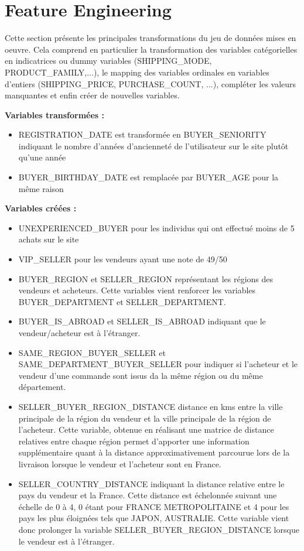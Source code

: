 
\chapter{Feature Engineering}

Cette section présente les principales transformations du jeu de données mises en oeuvre.
Cela comprend en particulier la transformation des variables catégorielles en
indicatrices ou dummy variables (SHIPPING_MODE, PRODUCT_FAMILY,...), le mapping des variables 
ordinales en variables d'entiers (SHIPPING_PRICE, PURCHASE_COUNT, ...),
compléter les valeurs manquantes et enfin créer de nouvelles variables.

\textbf{Variables transformées :}

\begin{itemize}
\item REGISTRATION_DATE est transformée en BUYER_SENIORITY indiquant le nombre d'années
d'ancienneté de l'utilisateur sur le site plutôt qu'une année 
\item BUYER_BIRTHDAY_DATE est remplacée par BUYER_AGE pour la même raison
\end{itemize}

\textbf{Variables créées :}

\begin{itemize}
\item UNEXPERIENCED_BUYER pour les individus qui ont effectué moins de 5 achats sur le site
\item VIP_SELLER pour les vendeurs ayant une note de 49/50
\item BUYER_REGION et SELLER_REGION représentant les régions des vendeurs et acheteurs.
Cette variables vient renforcer les variables BUYER_DEPARTMENT et SELLER_DEPARTMENT.
\item BUYER_IS_ABROAD et SELLER_IS_ABROAD indiquant que le vendeur/acheteur est à l'étranger.
\item SAME_REGION_BUYER_SELLER et SAME_DEPARTMENT_BUYER_SELLER pour indiquer si l'acheteur
et le vendeur d'une commande sont issus da la même région ou du même département.
\item SELLER_BUYER_REGION_DISTANCE distance en kms entre la ville principale de la région
du vendeur et la ville principale de la région de l'acheteur. Cette variable, obtenue en 
réalisant une matrice de distance relatives entre chaque région permet d'apporter une
information supplémentaire quant à la distance approximativement parcourue lors de la 
livraison lorsque le vendeur et l'acheteur sont en France. 
\item SELLER_COUNTRY_DISTANCE indiquant la distance relative entre le pays du vendeur et la France. 
Cette distance est échelonnée suivant une échelle de 0 à 4, 0 étant pour FRANCE METROPOLITAINE et 4 pour les 
pays les plus éloignées tels que JAPON, AUSTRALIE. Cette variable vient donc prolonger la variable
SELLER_BUYER_REGION_DISTANCE lorsque le vendeur est à l'étranger.
\end{itemize}

